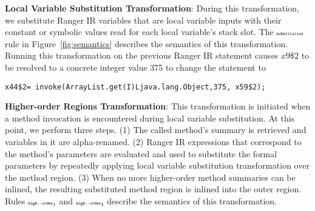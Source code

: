 \textbf{Local Variable Substitution Transformation}: During this transformation, we substitute Ranger IR variables that
are local variable inputs with their constant or symbolic values read for each local variable\rq s stack slot.
%
The $\scriptscriptstyle\mathtt{substitution}$ rule in Figure~\ref{fig:semantics} describes the semantics of this transformation.
%
Running this transformation on the previous Ranger IR statement causes $x9\$2$ to be
resolved to a concrete integer value 375 to change the statement to %
\begin{lstlisting}
x44$2= invoke(ArrayList.get(I)Ljava.lang.Object,375, x59$2);
\end{lstlisting}
%
\textbf{Higher-order Regions Transformation}: This transformation is initiated when a method invocation is encountered
during local variable substitution.
%
At this point, we perform three steps.
%
(1) The called method\rq s summary is retrieved and variables in it are alpha-renamed.
%
(2) Ranger IR expressions that correspond to the method\rq s parameters are evaluated and used to substitute the formal
parameters by repeatedly applying local variable substitution transformation over the method region.
%
(3) When no more higher-order method summaries can be inlined, the resulting substituted method region is inlined into
the outer region.
%
Rules $\scriptscriptstyle\mathtt{high-order_1}$ and $\scriptscriptstyle\mathtt{high-order_2}$ describe the semantics of this transformation.

